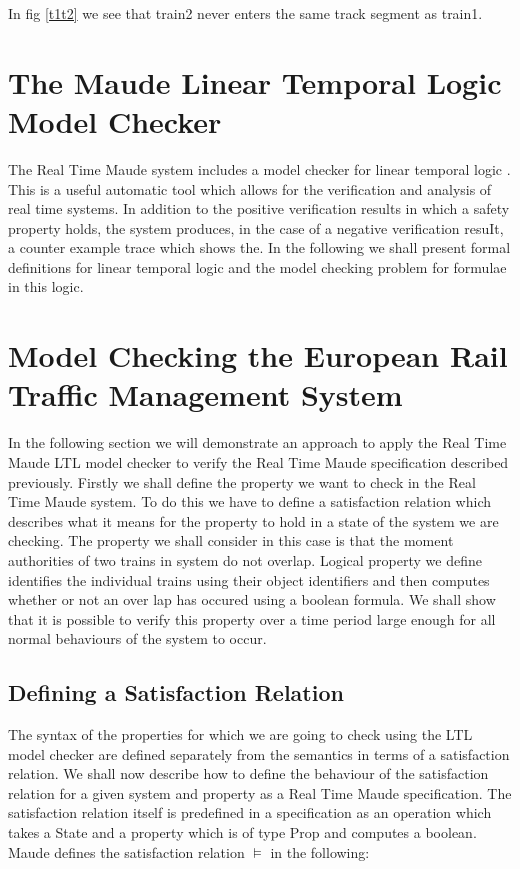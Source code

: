 In fig \ref{t1t2} we see that train2 never enters the same track segment as train1.

\section{The Maude Linear Temporal Logic Model Checker}
The Real Time Maude system includes a model checker for linear temporal logic \cite{ES00}.  This is a useful automatic tool which allows for the verification and analysis of real time systems. In addition to the positive verification results in which a safety property holds,  the system produces, in the case of a negative verification resuIt, a counter example trace which shows the. In the following we shall present formal definitions for linear temporal logic and the model checking problem for formulae in this logic.

 

\section{Model Checking the European Rail Traffic Management System}
In the following section we will demonstrate an approach to apply the Real Time Maude LTL model checker to verify the Real Time Maude specification described previously.
Firstly we shall define the property we want to check in the Real Time Maude system. To do this we have to define a satisfaction relation which describes what it means for the property to hold in a state of the system we are checking.  The property we shall consider in this case is that the moment authorities of two trains in system do not overlap. Logical property we define identifies the individual trains using their object identifiers and then computes whether or not an over lap has occured using a boolean formula.  We shall show that it is possible to verify this property over a time period large enough for all normal behaviours of the system to occur. 

\subsection*{Defining a Satisfaction Relation}
The syntax of the properties for which we are going to check using the LTL model checker are defined separately from the semantics in terms of a satisfaction relation.
We shall now describe how to define the behaviour of the satisfaction relation for a given system and property as a Real Time Maude specification. The satisfaction relation itself is predefined in a specification as an operation which takes a State and a property which is of type Prop and computes a boolean. Maude defines the satisfaction relation $\models$ in the following:
\medskip

